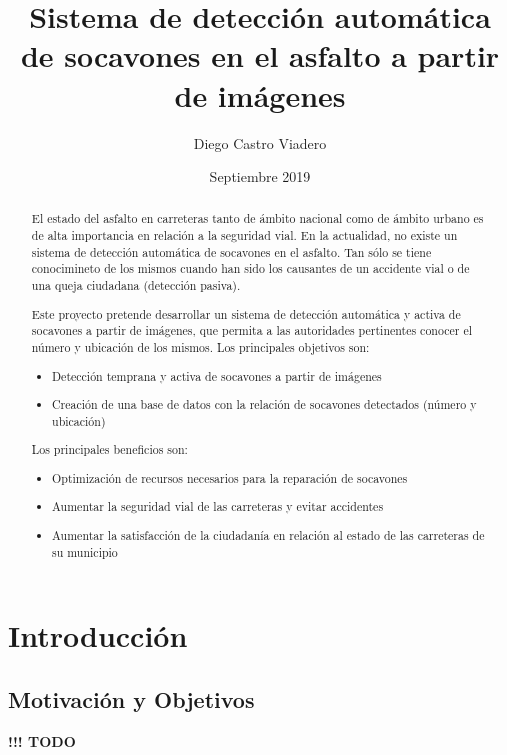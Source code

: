 \documentclass[]{article}
\title{Sistema de detección automática de socavones en el asfalto a partir de imágenes}
\author{Diego Castro Viadero}
\date{Septiembre 2019}
\begin{document}
\maketitle

\begin{abstract}
El estado del asfalto en carreteras tanto de ámbito nacional como de ámbito urbano es de alta importancia en relación a la seguridad vial. En la actualidad, no existe un sistema de detección automática de socavones en el asfalto. Tan sólo se tiene conocimineto de los mismos cuando han sido los causantes de un accidente vial o de una queja ciudadana (detección pasiva).

Este proyecto pretende desarrollar un sistema de detección automática y activa de socavones a partir de imágenes, que permita a las autoridades pertinentes conocer el número y ubicación de los mismos. Los principales objetivos son:

\begin{itemize}
	\item Detección temprana y activa de socavones a partir de imágenes
	\item Creación de una base de datos con la relación de socavones detectados (número y ubicación)
\end{itemize}

Los principales beneficios son:

\begin{itemize}
	\item Optimización de recursos necesarios para la reparación de socavones
	\item Aumentar la seguridad vial de las carreteras y evitar accidentes
	\item Aumentar la satisfacción de la ciudadanía en relación al estado de las carreteras de su municipio
\end{itemize}
\end{abstract}

\newpage
\tableofcontents{}
\newpage

\section{Introducción}

\subsection{Motivación y Objetivos}

\textbf{!!! TODO}
\end{document}
